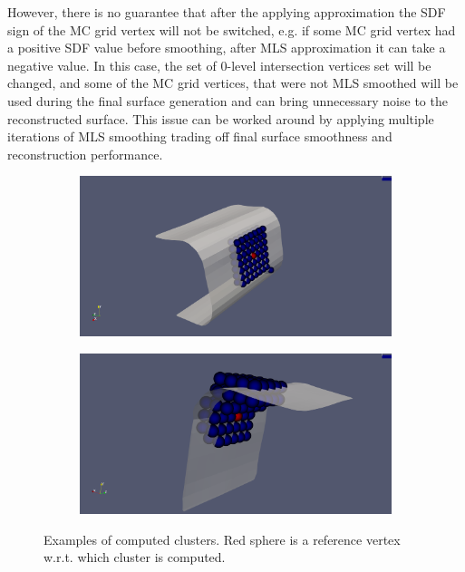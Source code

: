 However, there is no guarantee that after the applying approximation the SDF sign of the MC grid vertex will not be switched, e.g. if some MC grid vertex had a positive SDF value before smoothing, after MLS approximation it can take a negative value. In this case, the set of 0-level intersection vertices set will be changed, and some of the MC grid vertices, that were not MLS smoothed will be used during the final surface generation and can bring unnecessary noise to the reconstructed surface. This issue can be worked around by applying multiple iterations of MLS smoothing trading off final surface smoothness and reconstruction performance.\\
\begin{figure}[H]
	\begin{center}
		\begin{subfigure}[b]{0.45\textwidth}
			\includegraphics[width=\textwidth]{figures/MlsCluster.png}
		\end{subfigure}
		\begin{subfigure}[b]{0.45\textwidth}
			\includegraphics[width=\textwidth]{figures/MlsCluster2.png}
		\end{subfigure}
	\end{center}
	\caption{Examples of computed clusters. Red sphere is a reference vertex w.r.t. which cluster is computed.}
	\label{fig:clusters}
\end{figure}

